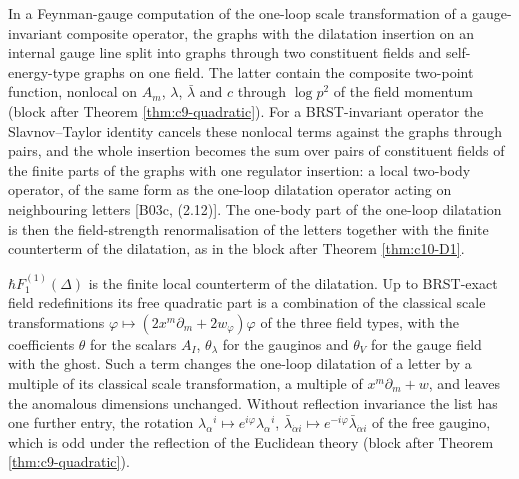 \begin{remark}
In a Feynman-gauge computation of the one-loop scale transformation of a gauge-invariant composite operator, the graphs with the dilatation insertion on an internal gauge line split into graphs through two constituent fields and self-energy-type graphs on one field. The latter contain the composite two-point function, nonlocal on $A_m$, $\lambda$, $\bar\lambda$ and $c$ through $\log p^2$ of the field momentum (block after Theorem \ref{thm:c9-quadratic}). For a BRST-invariant operator the Slavnov--Taylor identity cancels these nonlocal terms against the graphs through pairs, and the whole insertion becomes the sum over pairs of constituent fields of the finite parts of the graphs with one regulator insertion: a local two-body operator, of the same form as the one-loop dilatation operator acting on neighbouring letters [B03c, (2.12)]. The one-body part of the one-loop dilatation is then the field-strength renormalisation of the letters together with the finite counterterm of the dilatation, as in the block after Theorem \ref{thm:c10-D1}.
\end{remark}

\begin{remark}
$\hbar F_1^{(1)}(\Delta)$ is the finite local counterterm of the dilatation. Up to BRST-exact field redefinitions its free quadratic part is a combination of the classical scale transformations $\varphi\mapsto(2x^m\partial_m+2w_\varphi)\varphi$ of the three field types, with the coefficients $\theta$ for the scalars $A_I$, $\theta_\lambda$ for the gauginos and $\theta_V$ for the gauge field with the ghost. Such a term changes the one-loop dilatation of a letter by a multiple of its classical scale transformation, a multiple of $x^m\partial_m+w$, and leaves the anomalous dimensions unchanged. Without reflection invariance the list has one further entry, the rotation $\lambda_\alpha{}^i\mapsto e^{i\varphi}\lambda_\alpha{}^i$, $\bar\lambda_{\dot\alpha i}\mapsto e^{-i\varphi}\bar\lambda_{\dot\alpha i}$ of the free gaugino, which is odd under the reflection of the Euclidean theory (block after Theorem \ref{thm:c9-quadratic}).
\end{remark}

